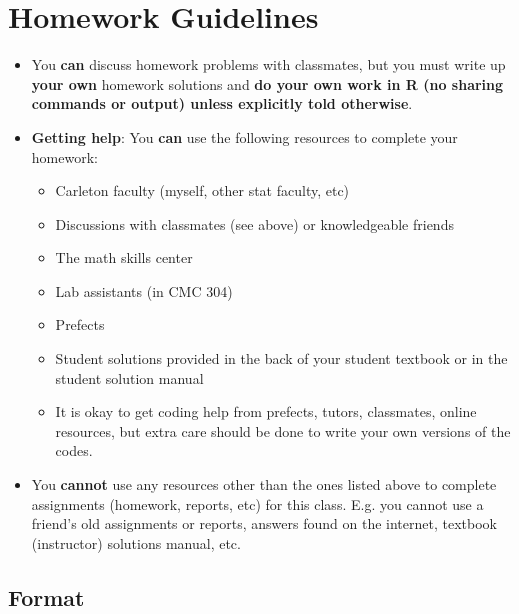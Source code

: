 \documentclass[
]{book}
\providecommand{\tightlist}{%
  \setlength{\itemsep}{0pt}\setlength{\parskip}{0pt}}
\begin{document}
\hypertarget{homework-guidelines}{%
\chapter{Homework Guidelines}\label{homework-guidelines}}

\begin{itemize}
\tightlist
\item
  You \textbf{can} discuss homework problems with classmates, but you must write up \textbf{your own} homework solutions and \textbf{do your own work in R (no sharing commands or output) unless explicitly told otherwise}.
\item
  \textbf{Getting help}: You \textbf{can} use the following resources to complete your homework:

  \begin{itemize}
  \tightlist
  \item
    Carleton faculty (myself, other stat faculty, etc)
  \item
    Discussions with classmates (see above) or knowledgeable friends
  \item
    The math skills center
  \item
    Lab assistants (in CMC 304)
  \item
    Prefects
  \item
    Student solutions provided in the back of your student textbook or in the student solution manual
  \item
    It is okay to get coding help from prefects, tutors, classmates, online resources, but extra care should be done to write your own versions of the codes.
  \end{itemize}
\item
  You \textbf{cannot} use any resources other than the ones listed above to complete assignments (homework, reports, etc) for this class. E.g. you cannot use a friend's old assignments or reports, answers found on the internet, textbook (instructor) solutions manual, etc.
\end{itemize}

\hypertarget{format}{%
\section{Format}\label{format}}
\end{document}

